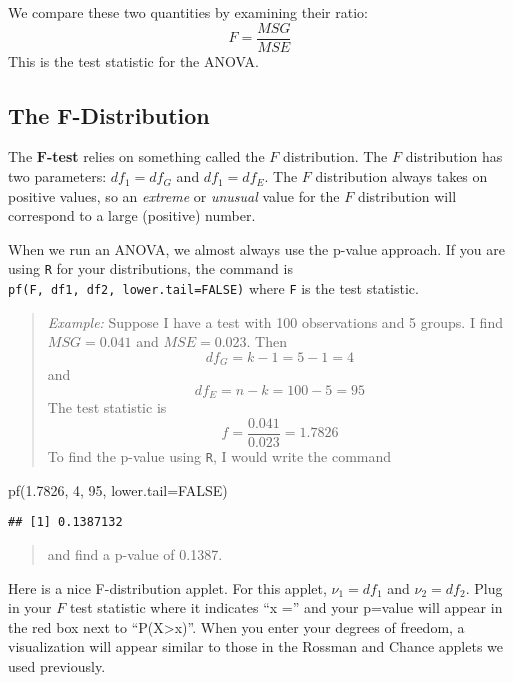\documentclass[
]{book}
\newenvironment{Shaded}{\begin{snugshade}}{\end{snugshade}}
\newcommand{\AttributeTok}[1]{\textcolor[rgb]{0.77,0.63,0.00}{#1}}
\newcommand{\ConstantTok}[1]{\textcolor[rgb]{0.00,0.00,0.00}{#1}}
\newcommand{\DecValTok}[1]{\textcolor[rgb]{0.00,0.00,0.81}{#1}}
\newcommand{\FloatTok}[1]{\textcolor[rgb]{0.00,0.00,0.81}{#1}}
\newcommand{\FunctionTok}[1]{\textcolor[rgb]{0.00,0.00,0.00}{#1}}
\newcommand{\NormalTok}[1]{#1}
\begin{document}
We compare these two quantities by examining their ratio: \[F = \frac{MSG}{MSE}\] This is the test statistic for the ANOVA.

\hypertarget{the-f-distribution}{%
\subsection{The F-Distribution}\label{the-f-distribution}}

The \(\boldsymbol{F}\)\textbf{-test} relies on something called the \(F\) distribution. The \(F\) distribution has two parameters: \(df_1=df_G\) and \(df_1=df_E\). The \(F\) distribution always takes on positive values, so an \emph{extreme} or \emph{unusual} value for the \(F\) distribution will correspond to a large (positive) number.

When we run an ANOVA, we almost always use the p-value approach. If you are using \texttt{R} for your distributions, the command is \texttt{pf(F,\ df1,\ df2,\ lower.tail=FALSE)} where \texttt{F} is the test statistic.

\begin{quote}
\emph{Example:} Suppose I have a test with 100 observations and 5 groups. I find \(MSG = 0.041\) and \(MSE = 0.023\). Then \[df_G = k-1 = 5-1 = 4\] and \[df_E = n-k = 100-5 = 95\] The test statistic is \[f = \frac{0.041}{0.023} = 1.7826\] To find the p-value using \texttt{R}, I would write the command
\end{quote}

\begin{Shaded}
\begin{Highlighting}[]
\FunctionTok{pf}\NormalTok{(}\FloatTok{1.7826}\NormalTok{, }\DecValTok{4}\NormalTok{, }\DecValTok{95}\NormalTok{, }\AttributeTok{lower.tail=}\ConstantTok{FALSE}\NormalTok{)}
\end{Highlighting}
\end{Shaded}

\begin{verbatim}
## [1] 0.1387132
\end{verbatim}

\begin{quote}
and find a p-value of 0.1387.
\end{quote}

Here is a nice F-distribution applet. For this applet, \(\nu_1 = df_1\) and \(\nu_2 = df_2\). Plug in your \(F\) test statistic where it indicates ``x ='' and your p=value will appear in the red box next to ``P(X\textgreater x)''. When you enter your degrees of freedom, a visualization will appear similar to those in the Rossman and Chance applets we used previously.
\end{document}
